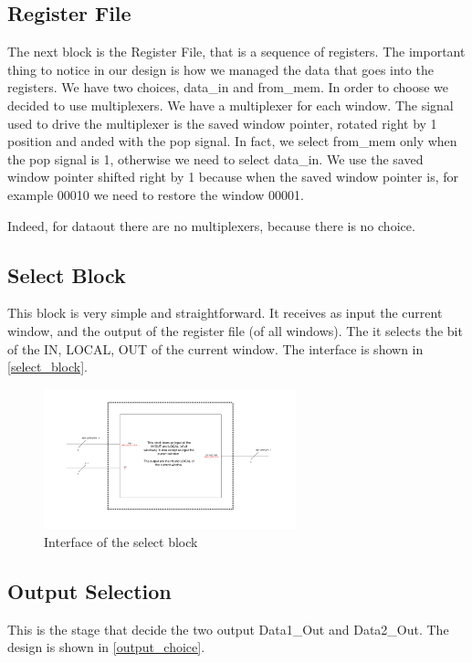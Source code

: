 \newpage

\subsection{Register File}

The next block is the Register File, that is a sequence of registers. The important thing to notice in our design is how we managed the data that goes into the registers. We have two choices, data\_in and from\_mem. In order to choose we decided to use multiplexers. 
We have a multiplexer for each window. The signal used to drive the multiplexer is the saved window pointer, rotated right by 1 position and anded with the pop signal. In fact, we select from\_mem only when the pop signal is 1, otherwise we need to select data\_in. 
We use the saved window pointer shifted right by 1 because when the saved window pointer is, for example 00010 we need to restore the window 00001. 

Indeed, for dataout there are no multiplexers, because there is no choice. 

\subsection{Select Block}

This block is very simple and straightforward. It receives as input the current window, and the output of the register file (of all windows). The it selects the bit of the IN, LOCAL, OUT of the current window. The interface is shown in \autoref{select_block}.

\begin{figure}[ht]
  \centering
  \includegraphics[width=0.65\textwidth]{chapters/4_DecodeStage/images/select_block.pdf}
  \caption{Interface of the select block}
  \label{select_block}
\end{figure}

\subsection{Output Selection}
This is the stage that decide the two output Data1\_Out and Data2\_Out. The design is shown in \autoref{output_choice}.

